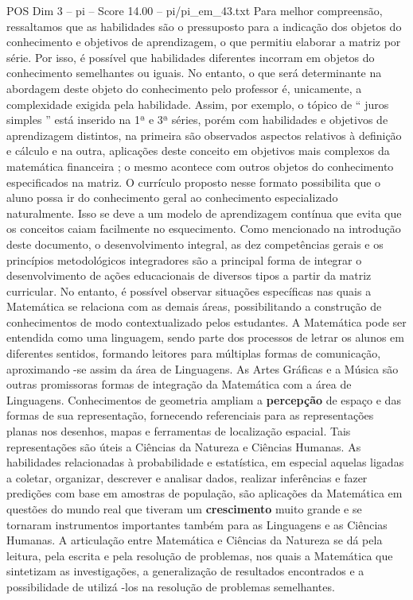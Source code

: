 \begin{textsample}{POS Dim 3 – pi – Score 14.00 – pi/pi\_em\_43.txt}
Para melhor compreensão, ressaltamos que as habilidades são o pressuposto para a indicação dos objetos do conhecimento e objetivos de aprendizagem, o que permitiu elaborar a matriz por série.
Por isso, é possível que habilidades diferentes incorram em objetos do conhecimento semelhantes ou iguais.
No entanto, o que será determinante na abordagem deste objeto do conhecimento pelo professor é, unicamente, a complexidade exigida pela habilidade.
Assim, por exemplo, o tópico de “ juros simples ” está inserido na 1ª e 3ª séries, porém com habilidades e objetivos de aprendizagem distintos, na primeira são observados aspectos relativos à definição e cálculo e na outra, aplicações deste conceito em objetivos mais complexos da matemática financeira ; o mesmo acontece com outros objetos do conhecimento especificados na matriz.
O currículo proposto nesse formato possibilita que o aluno possa ir do conhecimento geral ao conhecimento especializado naturalmente.
Isso se deve a um modelo de aprendizagem contínua que evita que os conceitos caiam facilmente no esquecimento.
Como mencionado na introdução deste documento, o desenvolvimento integral, as dez competências gerais e os princípios metodológicos integradores são a principal forma de integrar o desenvolvimento de ações educacionais de diversos tipos a partir da matriz curricular.
No entanto, é possível observar situações específicas nas quais a Matemática se relaciona com as demais áreas, possibilitando a construção de conhecimentos de modo contextualizado pelos estudantes.
A Matemática pode ser entendida como uma linguagem, sendo parte dos processos de letrar os alunos em diferentes sentidos, formando leitores para múltiplas formas de comunicação, aproximando -se assim da área de Linguagens.
As Artes Gráficas e a Música são outras promissoras formas de integração da Matemática com a área de Linguagens.
Conhecimentos de geometria ampliam a \textbf{percepção} de espaço e das formas de sua representação, fornecendo referenciais para as representações planas nos desenhos, mapas e ferramentas de localização espacial.
Tais representações são úteis a Ciências da Natureza e Ciências Humanas.
As habilidades relacionadas à probabilidade e estatística, em especial aquelas ligadas a coletar, organizar, descrever e analisar dados, realizar inferências e fazer predições com base em amostras de população, são aplicações da Matemática em questões do mundo real que tiveram um \textbf{crescimento} muito grande e se tornaram instrumentos importantes também para as Linguagens e as Ciências Humanas.
A articulação entre Matemática e Ciências da Natureza se dá pela leitura, pela escrita e pela resolução de problemas, nos quais a Matemática que sintetizam as investigações, a generalização de resultados encontrados e a possibilidade de utilizá -los na resolução de problemas semelhantes.

\end{textsample}
